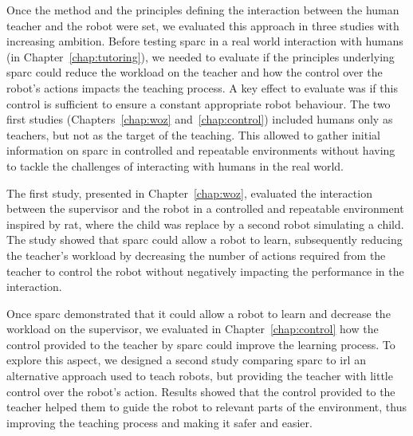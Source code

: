 Once the method and the principles defining the interaction between the human teacher and the robot were set, we evaluated this approach in three studies with increasing ambition. Before testing \gls{sparc} in a real world interaction with humans (in Chapter~\ref{chap:tutoring}), we needed to evaluate if the principles underlying \gls{sparc} could reduce the workload on the teacher and how the control over the robot's actions impacts the teaching process. A key effect to evaluate was if this control is sufficient to ensure a constant appropriate robot behaviour. The two first studies (Chapters~\ref{chap:woz} and~\ref{chap:control}) included humans only as teachers, but not as the target of the teaching. This allowed to gather initial information on \gls{sparc} in controlled and repeatable environments without having to tackle the challenges of interacting with humans in the real world.

The first study, presented in Chapter~\ref{chap:woz}, evaluated the interaction between the supervisor and the robot in a controlled and repeatable environment inspired by \gls{rat}, where the child was replace by a second robot simulating a child. The study showed that \gls{sparc} could allow a robot to learn, subsequently reducing the teacher's workload by decreasing the number of actions required from the teacher to control the robot without negatively impacting the performance in the interaction.

Once \gls{sparc} demonstrated that it could allow a robot to learn and decrease the workload on the supervisor, we evaluated in Chapter~\ref{chap:control} how the control provided to the teacher by \gls{sparc} could improve the learning process. To explore this aspect, we designed a second study comparing \gls{sparc} to \gls{irl} an alternative approach used to teach robots, but providing the teacher with little control over the robot's action. Results showed that the control provided to the teacher helped them to guide the robot to relevant parts of the environment, thus improving the teaching process and making it safer and easier.

